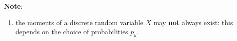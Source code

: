 \vspace{0.5cm}
\textbf{Note}:
\begin{enumerate}
    \item the moments of a discrete random variable $X$ may \textbf{not} always exist: this depends on the choice of probabilities $p _k $.
    \hfill \cite{statistics/book/Statistics-for-Data-Scientists/Maurits-Kaptein}
\end{enumerate}












